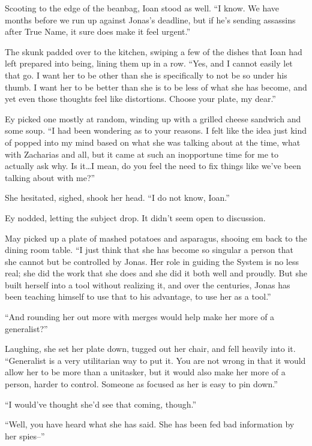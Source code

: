 Scooting to the edge of the beanbag, Ioan stood as well. ``I know. We have months before we run up against Jonas's deadline, but if he's sending assassins after True Name, it sure does make it feel urgent.''

The skunk padded over to the kitchen, swiping a few of the dishes that Ioan had left prepared into being, lining them up in a row. ``Yes, and I cannot easily let that go. I want her to be other than she is specifically to not be so under his thumb. I want her to be better than she is to be less of what she has become, and yet even those thoughts feel like distortions. Choose your plate, my dear.''

Ey picked one mostly at random, winding up with a grilled cheese sandwich and some soup. ``I had been wondering as to your reasons. I felt like the idea just kind of popped into my mind based on what she was talking about at the time, what with Zacharias and all, but it came at such an inopportune time for me to actually ask why. Is it\ldots I mean, do you feel the need to fix things like we've been talking about with me?''

She hesitated, sighed, shook her head. ``I do not know, Ioan.''

Ey nodded, letting the subject drop. It didn't seem open to discussion.

May picked up a plate of mashed potatoes and asparagus, shooing em back to the dining room table. ``I just think that she has become so singular a person that she cannot but be controlled by Jonas. Her role in guiding the System is no less real; she did the work that she does and she did it both well and proudly. But she built herself into a tool without realizing it, and over the centuries, Jonas has been teaching himself to use that to his advantage, to use her as a tool.''

``And rounding her out more with merges would help make her more of a generalist?''

Laughing, she set her plate down, tugged out her chair, and fell heavily into it. ``Generalist is a very utilitarian way to put it. You are not wrong in that it would allow her to be more than a unitasker, but it would also make her more of a person, harder to control. Someone as focused as her is easy to pin down.''

``I would've thought she'd see that coming, though.''

``Well, you have heard what she has said. She has been fed bad information by her spies--''

